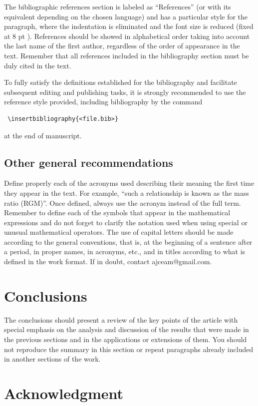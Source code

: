 \documentclass[eng,blind]{ajceam-class}
\begin{document}
The bibliographic references section is labeled as ``References'' (or with its equivalent depending on the chosen language) and has a particular style for the paragraph, where the indentation is eliminated and the font size is reduced (fixed at 8 pt ). References should be showed in alphabetical order taking into account the last name of the first author, regardless of the order of appearance in the text. Remember that all references included in the bibliography section must be duly cited in the text.

To fully satisfy the definitions established for the bibliography and facilitate subsequent editing and publishing tasks, it is strongly recommended to use the reference style provided, including bibliography by the command
\begin{verbatim}
 \insertbibliography{<file.bib>} 
\end{verbatim}
at the end of manuscript.

\subsection{Other general recommendations}

Define properly each of the acronyms used describing their meaning the first time they appear in the text. For example, ``such a relationship is known as the mass ratio (RGM)''. Once defined, always use the acronym instead of the full term. Remember to define each of the symbols that appear in the mathematical expressions and do not forget to clarify the notation used when using special or unusual mathematical operators. The use of capital letters should be made according to the general conventions, that is, at the beginning of a sentence after a period, in proper names, in acronyms, etc., and in titles according to what is defined in the work format. If in doubt, contact ajceam@gmail.com.


\section{Conclusions}

The conclusions should present a review of the key points of the article with special emphasis on the analysis and discussion of the results that were made in the previous sections and in the applications or extensions of them. You should not reproduce the summary in this section or repeat paragraphs already included in another sections of the work.

\section{Acknowledgment}
\end{document}
